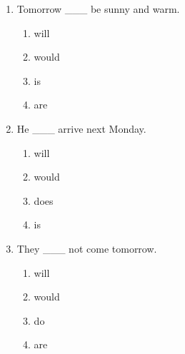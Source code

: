\documentclass[11pt,a4paper]{ctexart}
\begin{document}
\begin{enumerate}[leftmargin=*,itemsep=4pt]
\begin{enumerate}[label=\Alph*.,leftmargin=2em,itemsep=1pt,topsep=2pt]
\end{enumerate}
\item Tomorrow \_\_\_ be sunny and warm.
\begin{enumerate}[label=\Alph*.,leftmargin=2em,itemsep=1pt,topsep=2pt]
\item will
\item would
\item is
\item are
\end{enumerate}
\item He \_\_\_ arrive next Monday.
\begin{enumerate}[label=\Alph*.,leftmargin=2em,itemsep=1pt,topsep=2pt]
\item will
\item would
\item does
\item is
\end{enumerate}
\item They \_\_\_ not come tomorrow.
\begin{enumerate}[label=\Alph*.,leftmargin=2em,itemsep=1pt,topsep=2pt]
\item will
\item would
\item do
\item are
\end{enumerate}
\end{enumerate}
\end{document}
